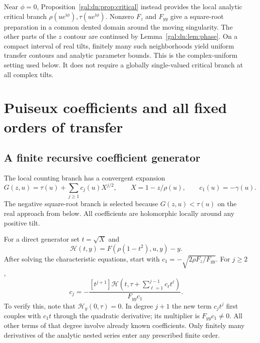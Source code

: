 \documentclass[11pt,letterpaper]{article}
\numberwithin{equation}{section}
\theoremstyle{definition}\newtheorem{definition}[theorem]{Definition}
\theoremstyle{remark}\newtheorem{remark}[theorem]{Remark}
\newcommand{\ii}{\mathrm i}
\begin{document}
Near $\phi=0$, Proposition~\ref{gal:dn:prop:critical} instead provides the local analytic critical branch $\rho(ue^{\ii\phi}),\tau(ue^{\ii\phi})$. Nonzero $F_z$ and $F_{yy}$ give a square-root preparation in a common dented domain around the moving singularity. The other parts of the $z$ contour are continued by Lemma~\ref{gal:dn:lem:phase}. On a compact interval of real tilts, finitely many such neighborhoods yield uniform transfer contours and analytic parameter bounds. This is the complex-uniform setting used below. It does not require a globally single-valued critical branch at all complex tilts.

\section{Puiseux coefficients and all fixed orders of transfer}\label{gal:dn:sec:puiseux}
\subsection{A finite recursive coefficient generator}
The local counting branch has a convergent expansion
\begin{equation}\label{gal:dn:eq:puiseux}
 G(z,u)=\tau(u)+\sum_{j\geq1}c_j(u)X^{j/2},\qquad
 X=1-z/\rho(u),\qquad c_1(u)=-\gamma(u).
\end{equation}
The negative square-root branch is selected because $G(z,u)<\tau(u)$ on the real approach from below. All coefficients are holomorphic locally around any positive tilt.

For a direct generator set $t=\sqrt X$ and
\[
 \mathcal H(t,y)=F(\rho(1-t^2),u,y)-y.
\]
After solving the characteristic equations, start with $c_1=-\sqrt{2\rho F_z/F_{yy}}$. For $j\geq2$,
\begin{equation}\label{gal:dn:eq:cgen}
 c_j=-\frac{[t^{j+1}]\mathcal H\!\left(t,\tau+\sum_{\ell=1}^{j-1}c_\ell t^\ell\right)}{F_{yy}c_1}.
\end{equation}
To verify this, note that $\mathcal H_y(0,\tau)=0$. In degree $j+1$ the new term $c_jt^j$ first couples with $c_1t$ through the quadratic derivative; its multiplier is $F_{yy}c_1\ne0$. All other terms of that degree involve already known coefficients. Only finitely many derivatives of the analytic nested series enter any prescribed finite order.
\end{document}

